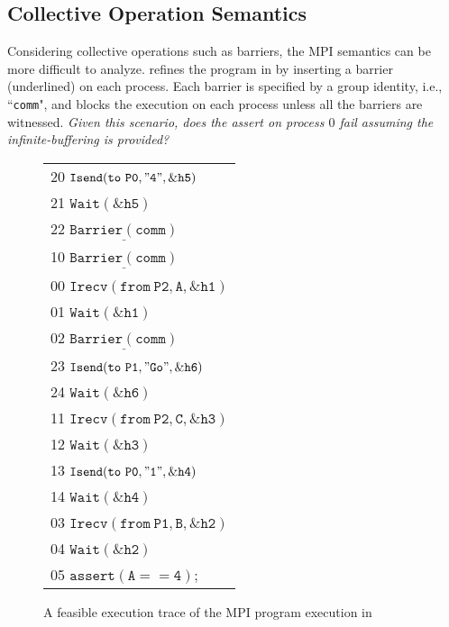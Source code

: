
\subsection{Collective Operation Semantics}
Considering collective operations such as barriers, the MPI semantics can be more difficult to analyze.  refines the program in  by inserting a barrier (underlined) on each process. Each barrier is specified by a group identity, i.e., ``\texttt{comm}", and blocks the execution on each process unless all the barriers are witnessed. \textit{Given this scenario, does the assert on process $0$ fail assuming the infinite-buffering is provided?}

\examplefigoneB

\begin{figure}[c]
\begin{center}
\setlength{\tabcolsep}{2pt}
\scriptsize \begin{tabular}[t]{l}
20 $\mathtt{Isend(to\ P0, "4", \&h5)}$ \\
21 $\mathtt{Wait(\&h5)}$\\
22 $\mathtt{\underline{Barrier(comm)}}$\\
\hline
10 $\mathtt{\underline{Barrier(comm)}}$\\
\hline
00 $\mathtt{Irecv(from\ P2, A, \&h1)}$ \\
01 $\mathtt{Wait(\&h1)}$ \\
02 $\mathtt{\underline{Barrier(comm)}}$\\
\hline
23 $\mathtt{Isend(to\ P1, "Go", \&h6)}$ \\
24 $\mathtt{Wait(\&h6)}$ \\
\hline
11 $\mathtt{Irecv(from\ P2, C, \&h3)}$ \\
12 $\mathtt{Wait(\&h3)}$ \\
13 $\mathtt{Isend(to\ P0, "1", \&h4)}$ \\
14 $\mathtt{Wait(\&h4)}$ \\
\hline
03 $\mathtt{Irecv(from\ P1, B, \&h2)}$ \\
04 $\mathtt{Wait(\&h2)}$ \\
05 $\mathtt{assert(A == 4);}$ \\
\hline
\end{tabular}
\end{center}
\caption{A feasible execution trace of the MPI program execution in }
\label{fig:trace3}
\end{figure}

